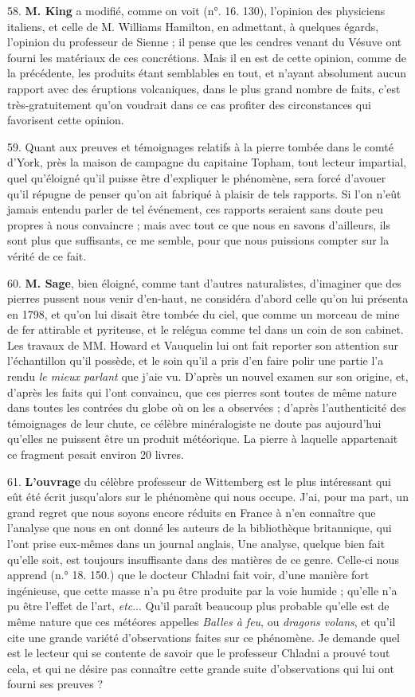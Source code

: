 \documentclass[a4paper, 11pt, oneside, polutonikogreek, french]{article}
\begin{document}
58. \textbf{M. King} a modifié, comme on voit (n°. 16. 130), l'opinion des physiciens italiens, et celle de M. Williams Hamilton, en admettant, à quelques égards, l'opinion du professeur de Sienne ; il pense que les cendres venant du Vésuve ont fourni les matériaux de ces concrétions. Mais il en est de cette opinion, comme de la précédente, les produits étant semblables en tout, et n'ayant absolument aucun rapport avec des éruptions volcaniques, dans le plus grand nombre de faits, c'est très-gratuitement qu'on voudrait dans ce cas profiter des circonstances qui favorisent cette opinion.

59. Quant aux preuves et témoignages relatifs à la pierre tombée dans le comté d'York, près la maison de campagne du capitaine Topham, tout lecteur impartial, quel qu’éloigné qu'il puisse être d'expliquer le phénomène, sera forcé d'avouer qu'il répugne de penser qu'on ait fabriqué à plaisir de tels rapports. Si l'on n'eût jamais entendu parler de tel événement, ces rapports seraient sans doute peu propres à nous convaincre ; mais avec tout ce que nous en savons d'ailleurs, ils sont plus que suffisants, ce me semble, pour que nous puissions compter sur la vérité de ce fait.

60. \textbf{M. Sage}, bien éloigné, comme tant d'autres naturalistes, d'imaginer que des pierres pussent nous venir d'en-haut, ne considéra d'abord celle qu'on lui présenta en 1798, et qu'on lui disait être tombée du ciel, que comme un morceau de mine de fer attirable et pyriteuse, et le relégua comme tel dans un coin de son cabinet. Les travaux de MM. Howard et Vauquelin lui ont fait reporter son attention sur l'échantillon qu'il possède, et le soin qu'il a pris d'en faire polir une partie l'a rendu \emph{le mieux parlant} que j'aie vu. D'après un nouvel examen sur son origine, et, d'après les faits qui l'ont convaincu, que ces pierres sont toutes de même nature dans toutes les contrées du globe où on les a observées ; d'après l'authenticité des témoignages de leur chute, ce célèbre minéralogiste ne doute pas aujourd'hui qu'elles ne puissent être un produit météorique. La pierre à laquelle appartenait ce fragment pesait environ 20 livres.

61. \textbf{L'ouvrage} du célèbre professeur de Wittemberg est le plus intéressant qui eût été écrit jusqu'alors sur le phénomène qui nous occupe. J'ai, pour ma part, un grand regret que nous soyons encore réduits en France à n'en connaître que l'analyse que nous en ont donné les auteurs de la bibliothèque britannique, qui l'ont prise eux-mêmes dans un journal anglais, Une analyse, quelque bien fait qu'elle soit, est toujours insuffisante dans des matières de ce genre. Celle-ci nous apprend (n.° 18. 150.) que le docteur Chladni fait voir, d'une manière fort ingénieuse, que cette masse n'a pu être produite par la voie humide ; qu'elle n'a pu être l'effet de l'art, \emph{etc}... Qu'il paraît beaucoup plus probable qu'elle est de même nature que ces météores appelles \emph{Balles à feu}, ou \emph{dragons volans}, et qu'il cite une grande variété d'observations faites sur ce phénomène. Je demande quel est le lecteur qui se contente de savoir que le professeur Chladni a prouvé tout cela, et qui ne désire pas connaître cette grande suite d'observations qui lui ont fourni ses preuves ?
\end{document}
